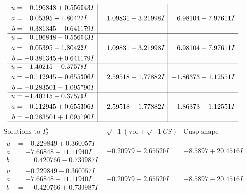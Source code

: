 \documentclass[1p]{elsarticle_modified}
\theoremstyle{definition}
\newcommand{\I}{\sqrt{-1}}
\begin{document}
$$\begin{array}{c|c|c}
\begin{aligned}
u &= \phantom{-}0.196848 + 0.556043 I \\
a &= \phantom{-}0.05395 + 1.80422 I \\
b &= -0.381345 - 0.641179 I\end{aligned}
 & \phantom{-}1.09831 + 3.21998 I & \phantom{-}6.98104 - 7.97611 I \\ \hline\begin{aligned}
u &= \phantom{-}0.196848 - 0.556043 I \\
a &= \phantom{-}0.05395 - 1.80422 I \\
b &= -0.381345 + 0.641179 I\end{aligned}
 & \phantom{-}1.09831 - 3.21998 I & \phantom{-}6.98104 + 7.97611 I \\ \hline\begin{aligned}
u &= -1.40215 + 0.37579 I \\
a &= -0.112945 - 0.655306 I \\
b &= -0.283501 - 1.095790 I\end{aligned}
 & \phantom{-}2.59518 - 1.77882 I & -1.86373 - 1.12551 I \\ \hline\begin{aligned}
u &= -1.40215 - 0.37579 I \\
a &= -0.112945 + 0.655306 I \\
b &= -0.283501 + 1.095790 I\end{aligned}
 & \phantom{-}2.59518 + 1.77882 I & -1.86373 + 1.12551 I\\
 \hline 
 \end{array}$$\newpage$$\begin{array}{c|c|c}  
\text{Solutions to }I^u_{2}& \I (\text{vol} + \sqrt{-1}CS) & \text{Cusp shape}\\
 \hline 
\begin{aligned}
u &= -0.229849 + 0.360057 I \\
a &= -7.66848 - 11.11940 I \\
b &= \phantom{-}0.420766 - 0.730987 I\end{aligned}
 & -0.20979 - 2.65520 I & -8.5897 + 20.4516 I \\ \hline\begin{aligned}
u &= -0.229849 - 0.360057 I \\
a &= -7.66848 + 11.11940 I \\
b &= \phantom{-}0.420766 + 0.730987 I\end{aligned}
 & -0.20979 + 2.65520 I & -8.5897 - 20.4516 I \\ \hline\begin{aligned}

\end{aligned}
\end{array}$$
\end{document}
